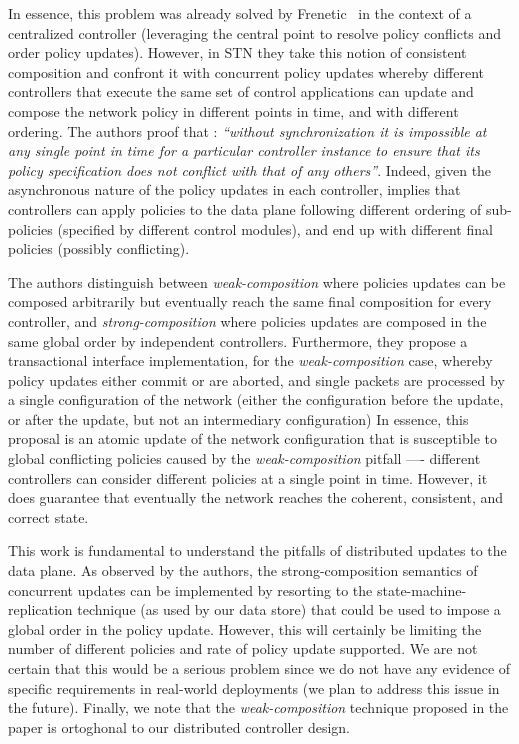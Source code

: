 In essence, this problem was already solved by Frenetic~\cite{Foster:2010wp} in the context of a centralized controller (leveraging the central point to resolve policy conflicts and order policy updates). 
However, in STN they take this notion of consistent composition and confront it with concurrent policy updates whereby different controllers that execute  the same set of control applications can update  and compose the network policy  in different points in time, and with different ordering. 
The authors proof that : \emph{``without synchronization it is impossible at any single point in time for a particular controller instance to ensure that its policy specification does not conflict with that of any others''}. 
 Indeed, given the asynchronous nature of the policy updates in each controller, implies that controllers can apply policies to the data plane following different ordering of sub-policies (specified by different control modules), and end up with different final policies (possibly conflicting). 

The authors  distinguish between \emph{weak-composition} where policies updates  can be composed arbitrarily but eventually reach the same final composition for every controller, and \emph{strong-composition} where policies updates are composed in the same global order by independent controllers.  
Furthermore, they propose a transactional interface implementation, for the \emph{weak-composition} case, whereby policy updates either commit or are aborted, and single packets are processed by a single configuration of the network (either the configuration before the update, or after the update, but not an intermediary configuration) 
In essence, this proposal is an atomic update of the network configuration that is susceptible to global conflicting policies caused by the \emph{weak-composition} pitfall ---- different controllers can consider different policies at a single point in time. 
However, it does guarantee that eventually the network reaches the coherent, consistent, and correct state. 

This work is fundamental to understand the pitfalls of distributed updates to the data plane.  
As observed by the authors, the strong-composition semantics of concurrent updates can be implemented by resorting to the state-machine-replication technique (as used by our data store) that could be used to impose a global order in the policy update. 
However, this will certainly be limiting the number of different policies and rate of policy update supported. 
We are not certain that this would be a serious problem  since we do not have any evidence of specific requirements in real-world deployments (we plan to address this issue in the future). 
Finally, we note that the \emph{weak-composition} technique proposed in the paper is ortoghonal to our distributed controller design. 

